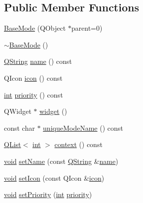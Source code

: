 \subsection*{Public Member Functions}
\begin{DoxyCompactItemize}
\item 
\hyperlink{group___core_plugin_ga001e234367e66731d03715a0d8aaa2a4}{Base\-Mode} (Q\-Object $\ast$parent=0)
\item 
\hyperlink{group___core_plugin_ga608e9b9a30ea7632f45add52726c8377}{$\sim$\-Base\-Mode} ()
\item 
\hyperlink{group___u_a_v_objects_plugin_gab9d252f49c333c94a72f97ce3105a32d}{Q\-String} \hyperlink{group___core_plugin_ga75b37730bea5a18036561c69d0e7ce85}{name} () const 
\item 
Q\-Icon \hyperlink{group___core_plugin_ga112e7a5d2e25d9a38cb8e52ec9f89431}{icon} () const 
\item 
\hyperlink{ioapi_8h_a787fa3cf048117ba7123753c1e74fcd6}{int} \hyperlink{group___core_plugin_ga078a908a836500c676c4acacee39ea94}{priority} () const 
\item 
Q\-Widget $\ast$ \hyperlink{group___core_plugin_ga458407ee9529a1d0067acd3e978ca63c}{widget} ()
\item 
const char $\ast$ \hyperlink{group___core_plugin_ga5712eab4028d979aa83e70cc8dd3962b}{unique\-Mode\-Name} () const 
\item 
\hyperlink{class_q_list}{Q\-List}$<$ \hyperlink{ioapi_8h_a787fa3cf048117ba7123753c1e74fcd6}{int} $>$ \hyperlink{group___core_plugin_ga931f95d0ee3f352b7e43bbba9e228480}{context} () const 
\item 
\hyperlink{group___u_a_v_objects_plugin_ga444cf2ff3f0ecbe028adce838d373f5c}{void} \hyperlink{group___core_plugin_ga77607e4c61894e21f5891306d0250810}{set\-Name} (const \hyperlink{group___u_a_v_objects_plugin_gab9d252f49c333c94a72f97ce3105a32d}{Q\-String} \&\hyperlink{glext_8h_ad977737dfc9a274a62741b9500c49a32}{name})
\item 
\hyperlink{group___u_a_v_objects_plugin_ga444cf2ff3f0ecbe028adce838d373f5c}{void} \hyperlink{group___core_plugin_gab9476a9a42bf5a928acb87d58b6e056c}{set\-Icon} (const Q\-Icon \&\hyperlink{group___core_plugin_ga112e7a5d2e25d9a38cb8e52ec9f89431}{icon})
\item 
\hyperlink{group___u_a_v_objects_plugin_ga444cf2ff3f0ecbe028adce838d373f5c}{void} \hyperlink{group___core_plugin_ga2c502184a77125dd76a4a78170257259}{set\-Priority} (\hyperlink{ioapi_8h_a787fa3cf048117ba7123753c1e74fcd6}{int} \hyperlink{group___core_plugin_ga078a908a836500c676c4acacee39ea94}{priority})

\end{DoxyCompactItemize}
